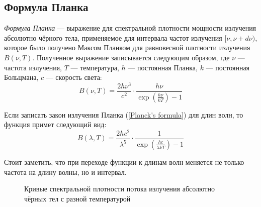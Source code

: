 \subsection{Формула Планка}

\textit{Формула Планка} --- выражение для спектральной плотности мощности излучения абсолютно чёрного тела, применяемое  для интервала частот излучения  $[\nu, \nu + d \nu)$, которое было получено Максом Планком для равновесной плотности излучения $B(\nu,T)$. Полученное выражение записывается следующим образом, где $\nu$ --- частота излучения, $T$ --- температура, $h$ --- постоянная Планка, $k$ --- постоянная Больцмана, $c$ --- скорость света:
\begin{equation}\label{Planck's formula}
B(\nu,T)=\frac{2h\nu^3}{c^2}\cdot \frac{h\nu}{\exp\left(\frac{h\nu}{kT}\right)-1}
\end{equation}

Если записать закон излучения Планка (\ref{Planck's formula}) для длин волн, то функция примет следующий вид:
\begin{equation}\label{Planck's formula2}
B(\lambda,T)=\frac{2hc^2}{\lambda^5} \cdot \frac{1}{\exp\left(\frac{hc}{\lambda kT}\right)-1}
\end{equation}

Стоит заметить, что при переходе функции к длинам волн меняется не только частота на длину волны, но и интервал. 

\begin{figure}[h!]
\begin{center}
\end{center}
\caption{Кривые спектральной плотности потока излучения абсолютно чёрных тел с разной температурой}\label{pic:wien-law}
\end{figure}

